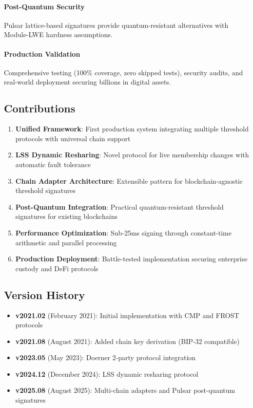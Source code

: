 \paragraph{Post-Quantum Security} Pulsar lattice-based signatures provide quantum-resistant alternatives with Module-LWE hardness assumptions.

\paragraph{Production Validation} Comprehensive testing (100\% coverage, zero skipped tests), security audits, and real-world deployment securing billions in digital assets.

\subsection{Contributions}

\begin{enumerate}
\item \textbf{Unified Framework}: First production system integrating multiple threshold protocols with universal chain support
\item \textbf{LSS Dynamic Resharing}: Novel protocol for live membership changes with automatic fault tolerance
\item \textbf{Chain Adapter Architecture}: Extensible pattern for blockchain-agnostic threshold signatures
\item \textbf{Post-Quantum Integration}: Practical quantum-resistant threshold signatures for existing blockchains
\item \textbf{Performance Optimization}: Sub-25ms signing through constant-time arithmetic and parallel processing
\item \textbf{Production Deployment}: Battle-tested implementation securing enterprise custody and DeFi protocols
\end{enumerate}

\subsection{Version History}

\begin{itemize}
\item \textbf{v2021.02} (February 2021): Initial implementation with CMP and FROST protocols
\item \textbf{v2021.08} (August 2021): Added chain key derivation (BIP-32 compatible)
\item \textbf{v2023.05} (May 2023): Doerner 2-party protocol integration
\item \textbf{v2024.12} (December 2024): LSS dynamic resharing protocol
\item \textbf{v2025.08} (August 2025): Multi-chain adapters and Pulsar post-quantum signatures
\end{itemize}

